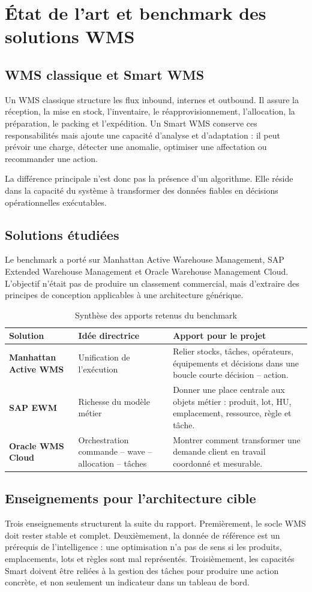 \chapter{État de l'art et benchmark des solutions WMS}
\section{WMS classique et Smart WMS}
Un WMS classique structure les flux inbound, internes et outbound. Il assure la réception, la mise en stock, l'inventaire, le réapprovisionnement, l'allocation, la préparation, le packing et l'expédition. Un Smart WMS conserve ces responsabilités mais ajoute une capacité d'analyse et d'adaptation : il peut prévoir une charge, détecter une anomalie, optimiser une affectation ou recommander une action.

La différence principale n'est donc pas la présence d'un algorithme. Elle réside dans la capacité du système à transformer des données fiables en décisions opérationnelles exécutables.

\section{Solutions étudiées}
Le benchmark a porté sur Manhattan Active Warehouse Management, SAP Extended Warehouse Management et Oracle Warehouse Management Cloud. L'objectif n'était pas de produire un classement commercial, mais d'extraire des principes de conception applicables à une architecture générique.

\begin{table}[H]
\centering
\caption{Synthèse des apports retenus du benchmark}
\begin{tabularx}{\linewidth}{>{\bfseries}p{3.2cm}X X}
\toprule
Solution & Idée directrice & Apport pour le projet \\
\midrule
Manhattan Active WMS & Unification de l'exécution & Relier stocks, tâches, opérateurs, équipements et décisions dans une boucle courte décision -- action. \\
SAP EWM & Richesse du modèle métier & Donner une place centrale aux objets métier : produit, lot, HU, emplacement, ressource, règle et tâche. \\
Oracle WMS Cloud & Orchestration commande -- wave -- allocation -- tâches & Montrer comment transformer une demande client en travail coordonné et mesurable. \\
\bottomrule
\end{tabularx}
\end{table}

\section{Enseignements pour l'architecture cible}
Trois enseignements structurent la suite du rapport. Premièrement, le socle WMS doit rester stable et complet. Deuxièmement, la donnée de référence est un prérequis de l'intelligence : une optimisation n'a pas de sens si les produits, emplacements, lots et règles sont mal représentés. Troisièmement, les capacités Smart doivent être reliées à la gestion des tâches pour produire une action concrète, et non seulement un indicateur dans un tableau de bord.
